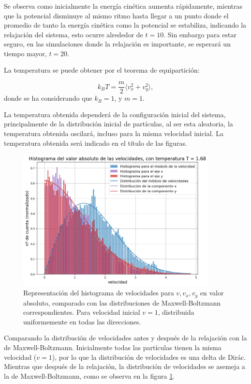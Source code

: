 \documentclass[11pt, twoside]{article} %
\begin{document}
Se observa como inicialmente la energía cinética aumenta rápidamente, mientras que
la potencial disminuye al mismo ritmo hasta llegar a un punto donde el promedio de 
tanto la energía cinética como la potencial se estabiliza, indicando la relajación 
del sistema, esto ocurre alrededor de $t=10$. Sin embargo para estar seguro, en las 
simulaciones donde la relajación es importante, se esperará un tiempo mayor, $t=20$.

La temperatura se puede obtener por el teorema de equipartición:

\begin{equation}
    k_B T = \frac{m}{2}\langle v_x^2 + v_y^2 \rangle,
\end{equation}
donde se ha considerando que $k_B =1$, y $m=1$.

La temperatura obtenida dependerá de la configuración inicial del sistema, 
principalmente de la distribución inicial de partículas, al ser esta aleatoria,
la temperatura obtenida oscilará, incluso para la misma velocidad inicial. 
La temperatura obtenida será indicado en el título de las figuras.

\begin{figure}[h!]
    \centering
    \includegraphics[width=0.9\textwidth]{plots/histograma_velocidad_1.png}
    \caption{Representación del histograma de velocidades para $v, v_x, v_y$ en valor
    absoluto, comparado con las distribuciones de Maxwell-Boltzmann correspondientes. 
    Para velocidad inicial $v=1$, distribuida uniformemente en todas las direcciones.}
    \label{fig:histograma_velocidad_1}
\end{figure}

Comparando la distribución de velocidades antes y después de la relajación con la 
de Maxwell-Boltzmann. Inicialmente todas las partículas tienen la misma velocidad
($v=1$), por lo que la distribución de velocidades es una delta de Dirác. Mientras 
que después de la relajación, la distribución de velocidades se asemeja a la de
Maxwell-Boltzmann, como se observa en la figura \ref{fig:histograma_velocidad_1}.
\end{document}
